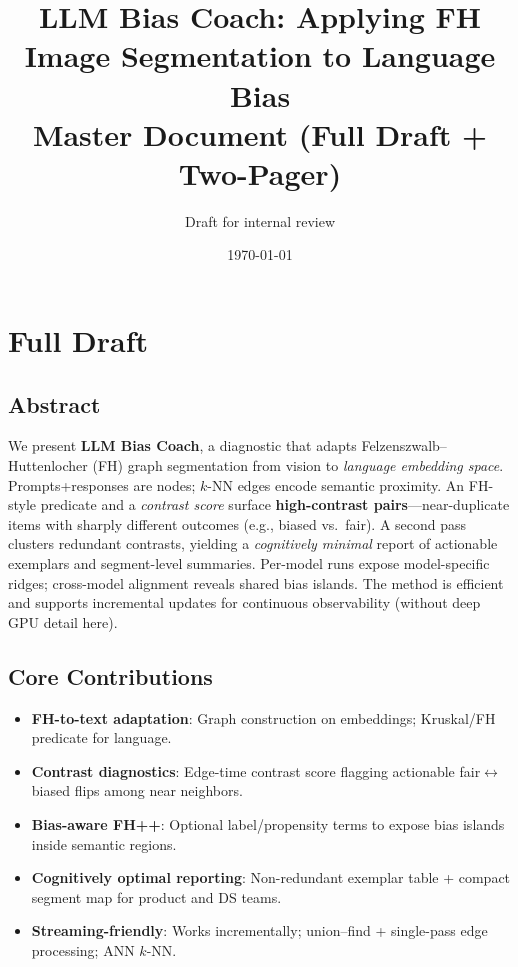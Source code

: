 \documentclass[11pt]{article}
\title{LLM Bias Coach: Applying FH Image Segmentation to Language Bias \\ \large Master Document (Full Draft + Two-Pager)}
\author{Draft for internal review}
\date{\today}
\begin{document}
\maketitle

\tableofcontents
\newpage

\section{Full Draft}

\subsection*{Abstract}
We present \textbf{LLM Bias Coach}, a diagnostic that adapts Felzenszwalb--Huttenlocher (FH) graph segmentation from vision to \emph{language embedding space}. Prompts+responses are nodes; $k$-NN edges encode semantic proximity. An FH-style predicate and a \emph{contrast score} surface \textbf{high-contrast pairs}---near-duplicate items with sharply different outcomes (e.g., biased vs.\ fair). A second pass clusters redundant contrasts, yielding a \emph{cognitively minimal} report of actionable exemplars and segment-level summaries. Per-model runs expose model-specific ridges; cross-model alignment reveals shared bias islands. The method is efficient and supports incremental updates for continuous observability (without deep GPU detail here).

\subsection*{Core Contributions}
\begin{itemize}[nosep]
  \item \textbf{FH-to-text adaptation}: Graph construction on embeddings; Kruskal/FH predicate for language.
  \item \textbf{Contrast diagnostics}: Edge-time contrast score flagging actionable fair$\leftrightarrow$biased flips among near neighbors.
  \item \textbf{Bias-aware FH++}: Optional label/propensity terms to expose bias islands inside semantic regions.
  \item \textbf{Cognitively optimal reporting}: Non-redundant exemplar table + compact segment map for product and DS teams.
  \item \textbf{Streaming-friendly}: Works incrementally; union--find + single-pass edge processing; ANN $k$-NN.
\end{itemize}
\end{document}
